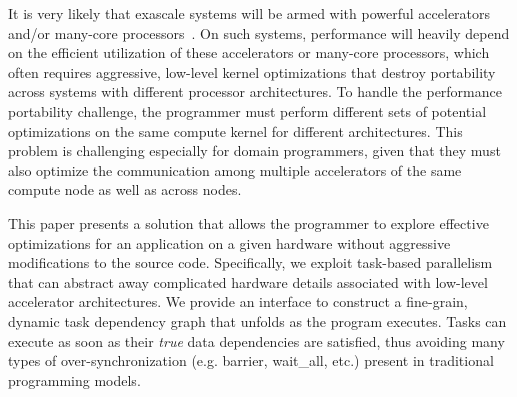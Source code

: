 It is very likely that exascale systems will be armed with powerful accelerators and/or many-core processors~\cite{ASCR/Exascale/Lethin, exascaleRoadMap}.
On such systems, performance will heavily depend on the efficient utilization of these accelerators or many-core processors, which often requires aggressive, low-level kernel optimizations that destroy portability across systems with different processor architectures.
To handle the performance portability challenge, the programmer must perform different sets of potential optimizations on the same compute kernel for different architectures.
This problem is challenging especially for domain programmers, given that they must also optimize the communication among multiple accelerators of the same compute node as well as across nodes.

This paper presents a solution that allows the programmer to explore effective optimizations for an application on a given hardware without aggressive modifications to the source code. 
Specifically, we exploit task-based parallelism that can abstract away complicated hardware details associated with low-level accelerator architectures.
We provide an interface to construct a fine-grain, dynamic task dependency graph that unfolds as the program executes. 
Tasks can execute as soon as their {\em true} data dependencies are satisfied, thus avoiding many types of over-synchronization (e.g. barrier, wait\_all, etc.) present in traditional programming models.

